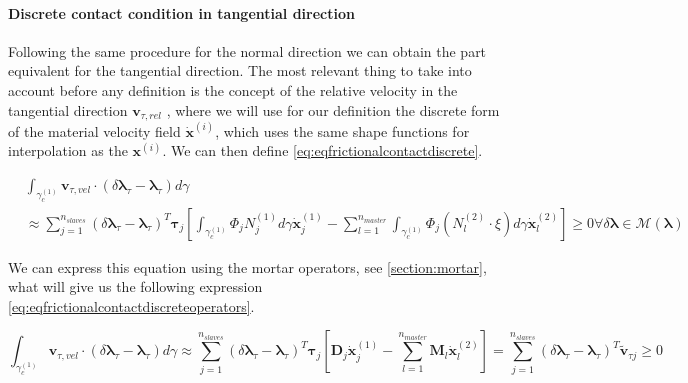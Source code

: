 \documentclass[a4paper,10pt]{article} %
\begin{document}
\paragraph{Discrete contact condition in tangential direction}

Following the same procedure for the normal direction we can obtain the part equivalent for the tangential direction. The most relevant thing to take into account before any definition is the concept of the relative velocity in the tangential direction $\mathbf{v}_{\tau, rel}$ , where we will use for our definition the discrete form of the material velocity field $\dot{\mathbf{x}}^{(i)}$, which uses the same shape functions for interpolation as the $\mathbf{x}^{(i)}$. We can then define \eqref{eq:eqfrictionalcontactdiscrete}.

\begin{equation}\label{eq:eqfrictionalcontactdiscrete}
\begin{aligned}
& \int_{\gamma_c^{(1)}} \mathbf{v}_{\tau, vel} \cdot \left( \delta \boldsymbol{\lambda}_\tau - \boldsymbol{\lambda}_\tau \right) d\gamma \\ & \approx \sum_{j=1}^{n_{slaves}} \left( \delta \boldsymbol{\lambda}_\tau - \boldsymbol{\lambda}_\tau \right)^T \boldsymbol{\tau}_j \left[ \int_{\gamma_c^{(1)}} \Phi_j N_j^{(1)} d\gamma \dot{\mathbf{x}}_j^{(1)} - \sum_{l=1}^{n_{master}} \int_{\gamma_c^{(1)}} \Phi_j \left(N_l^{(2)} \cdot \xi \right) d\gamma \dot{\mathbf{x}}_l^{(2)} \right] \geq 0 \forall \delta \boldsymbol{\lambda} \in \mathcal{M}(\boldsymbol{\lambda})
\end{aligned}
\end{equation}

We can express this equation using the mortar operators, see \ref{section:mortar}, what will give us the following expression \eqref{eq:eqfrictionalcontactdiscreteoperators}.

\begin{equation}\label{eq:eqfrictionalcontactdiscreteoperators}
 \int_{\gamma_c^{(1)}} \mathbf{v}_{\tau, vel} \cdot \left( \delta \boldsymbol{\lambda}_\tau - \boldsymbol{\lambda}_\tau \right) d\gamma \approx \sum_{j=1}^{n_{slaves}} \left( \delta \boldsymbol{\lambda}_\tau - \boldsymbol{\lambda}_\tau \right)^T \boldsymbol{\tau}_j \left[\mathbf{D}_{j} \dot{\mathbf{x}}_j^{(1)} - \sum_{l=1}^{n_{master}} \mathbf{M}_{l} \dot{\mathbf{x}}_l^{(2)} \right] =  \sum_{j=1}^{n_{slaves}} \left( \delta \boldsymbol{\lambda}_\tau - \boldsymbol{\lambda}_\tau \right)^T \tilde{\mathbf{v}}_{\tau j} \geq 0
\end{equation}
\end{document}
